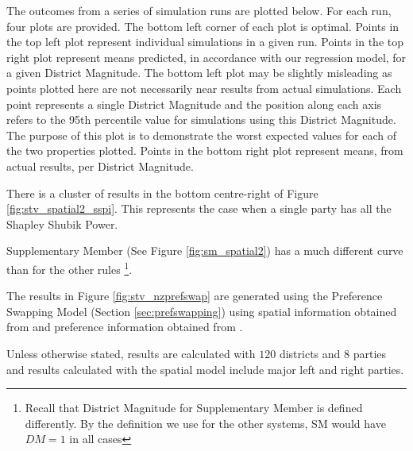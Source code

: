 \documentclass{article}
\begin{document}
The outcomes from a series of simulation runs are plotted below. For each run, four plots are provided. The bottom left corner of each plot is optimal. Points in the top left plot represent individual simulations in a given run. Points in the top right plot represent means predicted, in accordance with our regression model, for a given District Magnitude. The bottom left plot may be slightly misleading as points plotted here are not necessarily near results from actual simulations. Each point represents a single District Magnitude and the position along each axis refers to the 95th percentile value for simulations using this District Magnitude. The purpose of this plot is to demonstrate the worst expected values for each of the two properties plotted. Points in the bottom right plot represent means, from actual results, per District Magnitude.

There is a cluster of results in the bottom centre-right of Figure \ref{fig:stv_spatial2_sspi}. This represents the case when a single party has all the Shapley Shubik Power.

Supplementary Member (See Figure \ref{fig:sm_spatial2}) has a much different curve than for the other rules \footnote{Recall that District Magnitude for Supplementary Member is defined differently. By the definition we use for the other systems, SM would have $DM=1$ in all cases}.

The results in Figure \ref{fig:stv_nzprefswap} are generated using the Preference Swapping Model (Section \ref{sec:prefswapping}) using spatial information obtained from \cite{nzresults2011} and preference information obtained from \cite{nzes08}.

Unless otherwise stated, results are calculated with $120$ districts and $8$ parties and results calculated with the spatial model include major left and right parties.
\end{document}

